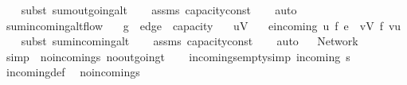 \begin{isabellebody}
%
\isadelimproof
\ \ %
\endisadelimproof
%
\isatagproof
{}\isamarkupfalse%
\ {\isacharparenleft}subst\ sum{\isacharunderscore}outgoing{\isacharunderscore}alt{\isacharparenright}\isanewline
\ \ \isamarkupfalse%
\ assms\ capacity{\isacharunderscore}const\isanewline
\ \ \isamarkupfalse%
\ auto%
\endisatagproof
{\isafoldproof}%
%
\isadelimproof
\isanewline
%
\endisadelimproof
\ \ \isanewline
{}\isamarkupfalse%
\ sum{\isacharunderscore}incoming{\isacharunderscore}alt{\isacharunderscore}flow{\isacharcolon}\isanewline
\ \ \ g\ {\isacharcolon}{\isacharcolon}\ {\isachardoublequoteopen}edge\ {\isasymRightarrow}\ {\isacharprime}capacity{\isachardoublequoteclose}\isanewline
\ \ \ {\isachardoublequoteopen}u{\isasymin}V{\isachardoublequoteclose}\isanewline
\ \ \ {\isachardoublequoteopen}{\isacharparenleft}{\isasymSum}e{\isasymin}incoming\ u{\isachardot}\ f\ e{\isacharparenright}\ {\isacharequal}\ {\isacharparenleft}{\isasymSum}v{\isasymin}V{\isachardot}\ f\ {\isacharparenleft}v{\isacharcomma}u{\isacharparenright}{\isacharparenright}{\isachardoublequoteclose}\isanewline
%
\isadelimproof
\ \ %
\endisadelimproof
%
\isatagproof
{}\isamarkupfalse%
\ {\isacharparenleft}subst\ sum{\isacharunderscore}incoming{\isacharunderscore}alt{\isacharparenright}\isanewline
\ \ \isamarkupfalse%
\ assms\ capacity{\isacharunderscore}const\isanewline
\ \ \isamarkupfalse%
\ auto%
\endisatagproof
{\isafoldproof}%
%
\isadelimproof
\isanewline
%
\endisadelimproof
{}\isamarkupfalse%
\ %
%
\isamarkuptrue%
\isamarkupfalse%
\ Network\isanewline
{}\isanewline
\ \ \isanewline
{}\isamarkupfalse%
\ {\isacharbrackleft}simp{\isacharbrackright}\ {\isacharequal}\ no{\isacharunderscore}incoming{\isacharunderscore}s\ no{\isacharunderscore}outgoing{\isacharunderscore}t\isanewline
\ \ \isanewline
{}\isamarkupfalse%
\ incoming{\isacharunderscore}s{\isacharunderscore}empty{\isacharbrackleft}simp{\isacharbrackright}{\isacharcolon}\ {\isachardoublequoteopen}incoming\ s\ {\isacharequal}\ {\isacharbraceleft}{\isacharbraceright}{\isachardoublequoteclose}\isanewline
%
\isadelimproof
\ \ %
\endisadelimproof
%
\isatagproof
{}\isamarkupfalse%
\ incoming{\isacharunderscore}def\ \isamarkupfalse%
\ no{\isacharunderscore}incoming{\isacharunderscore}s\ \isamarkupfalse%

\end{isabellebody}
